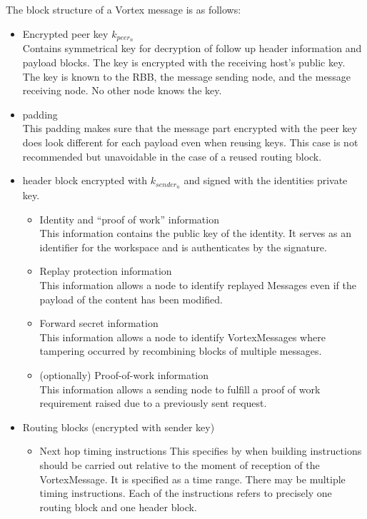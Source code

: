 \documentclass[10pt,journal,compsoc]{IEEEtran}
\begin{document}
The block structure of a Vortex message is as follows:
\begin{itemize}
	\item Encrypted peer key $k_{peer_n}$\\
          Contains symmetrical key for decryption of follow up header information and payload blocks. The key is encrypted with the receiving host's public key. The key is known to the RBB, the message sending node, and the message receiving node. No other node knows the key.
	\item padding\\
	      This padding makes sure that the message part encrypted with the peer key does look different for each payload even when reusing keys. This case is not recommended but unavoidable in the case of a reused routing block. 
	\item header block encrypted with $k_{sender_n}$ and signed with the identities private key.
	\begin{itemize}
		\item Identity and ``proof of work'' information\\
		      This information contains the public key of the identity. It serves as an identifier for the workspace and is authenticates by the signature.
		\item Replay protection information\\
		      This information allows a node to identify replayed Messages even if the payload of the content has been modified.
		\item Forward secret information\\
		      This information allows a node to identify VortexMessages where tampering occurred by recombining blocks of multiple messages.      
		\item (optionally) Proof-of-work information\\
              This information allows a sending node to fulfill a proof of work requirement raised due to a previously sent request.      
	\end{itemize}
	\item Routing blocks (encrypted with sender key)
	\begin{itemize}
		\item Next hop timing instructions
		      This specifies by when building instructions should be carried out relative to the moment of reception of the VortexMessage. It is specified as a time range. There may be multiple timing instructions. Each of the instructions refers to precisely one routing block and one header block.

\end{itemize}
\end{itemize}
\end{document}

